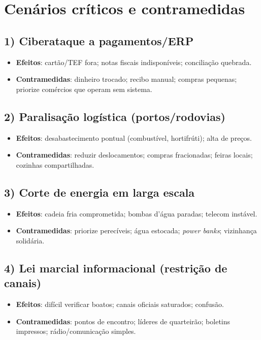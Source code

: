 \section{Cenários críticos e contramedidas}
\subsection*{1) Ciberataque a pagamentos/ERP}
\begin{itemize}[leftmargin=*,noitemsep]
  \item \textbf{Efeitos}: cartão/TEF fora; notas fiscais indisponíveis; conciliação quebrada.
  \item \textbf{Contramedidas}: dinheiro trocado; recibo manual; compras pequenas; priorize comércios que operam sem sistema.
\end{itemize}

\subsection*{2) Paralisação logística (portos/rodovias)}
\begin{itemize}[leftmargin=*,noitemsep]
  \item \textbf{Efeitos}: desabastecimento pontual (combustível, hortifrúti); alta de preços.
  \item \textbf{Contramedidas}: reduzir deslocamentos; compras fracionadas; feiras locais; cozinhas compartilhadas.
\end{itemize}

\subsection*{3) Corte de energia em larga escala}
\begin{itemize}[leftmargin=*,noitemsep]
  \item \textbf{Efeitos}: cadeia fria comprometida; bombas d'água paradas; telecom instável.
  \item \textbf{Contramedidas}: priorize perecíveis; água estocada; \emph{power banks}; vizinhança solidária.
\end{itemize}

\subsection*{4) Lei marcial informacional (restrição de canais)}
\begin{itemize}[leftmargin=*,noitemsep]
  \item \textbf{Efeitos}: difícil verificar boatos; canais oficiais saturados; confusão.
  \item \textbf{Contramedidas}: pontos de encontro; líderes de quarteirão; boletins impressos; rádio/comunicação simples.
\end{itemize}

